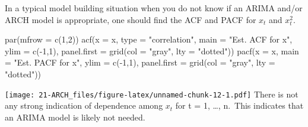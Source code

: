 \documentclass[
]{book}
\newenvironment{Shaded}{\begin{snugshade}}{\end{snugshade}}
\newcommand{\AttributeTok}[1]{\textcolor[rgb]{0.77,0.63,0.00}{#1}}
\newcommand{\DecValTok}[1]{\textcolor[rgb]{0.00,0.00,0.81}{#1}}
\newcommand{\FunctionTok}[1]{\textcolor[rgb]{0.00,0.00,0.00}{#1}}
\newcommand{\NormalTok}[1]{#1}
\newcommand{\SpecialCharTok}[1]{\textcolor[rgb]{0.00,0.00,0.00}{#1}}
\newcommand{\StringTok}[1]{\textcolor[rgb]{0.31,0.60,0.02}{#1}}
\theoremstyle{definition}
\theoremstyle{definition}
\theoremstyle{definition}
\theoremstyle{definition}
\theoremstyle{remark}
\begin{document}
In a typical model building situation when you do not know if an ARIMA and/or ARCH model is appropriate, one should find the ACF and PACF for \(x_t\) and \(x_t^2\).

\begin{Shaded}
\begin{Highlighting}[]
\FunctionTok{par}\NormalTok{(}\AttributeTok{mfrow =} \FunctionTok{c}\NormalTok{(}\DecValTok{1}\NormalTok{,}\DecValTok{2}\NormalTok{))}
\FunctionTok{acf}\NormalTok{(}\AttributeTok{x =}\NormalTok{ x, }\AttributeTok{type =} \StringTok{"correlation"}\NormalTok{, }\AttributeTok{main =} \StringTok{"Est. ACF for }
\StringTok{    x"}\NormalTok{, }\AttributeTok{ylim =} \FunctionTok{c}\NormalTok{(}\SpecialCharTok{{-}}\DecValTok{1}\NormalTok{,}\DecValTok{1}\NormalTok{), }\AttributeTok{panel.first =} \FunctionTok{grid}\NormalTok{(}\AttributeTok{col =} \StringTok{"gray"}\NormalTok{, }
    \AttributeTok{lty =} \StringTok{"dotted"}\NormalTok{))}
\FunctionTok{pacf}\NormalTok{(}\AttributeTok{x =}\NormalTok{ x, }\AttributeTok{main =} \StringTok{"Est. PACF for x"}\NormalTok{, }\AttributeTok{ylim =} \FunctionTok{c}\NormalTok{(}\SpecialCharTok{{-}}\DecValTok{1}\NormalTok{,}\DecValTok{1}\NormalTok{),}
    \AttributeTok{panel.first =} \FunctionTok{grid}\NormalTok{(}\AttributeTok{col =} \StringTok{"gray"}\NormalTok{, }\AttributeTok{lty =} \StringTok{"dotted"}\NormalTok{))}
\end{Highlighting}
\end{Shaded}

\texttt{[image: 21-ARCH\_files/figure-latex/unnamed-chunk-12-1.pdf]}
There is not any strong indication of dependence among \(x_t\) for t = 1, \ldots, n.~This indicates that an ARIMA model is likely not needed.
\end{document}
